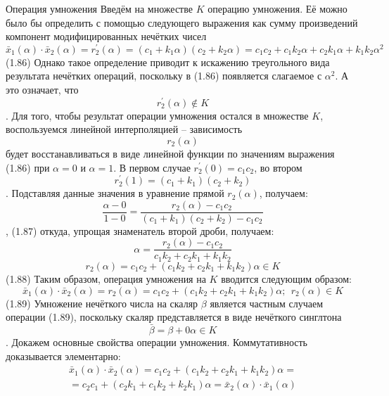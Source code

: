 Операция умножения
Введём на множестве $K$ операцию умножения. Её можно было бы определить с помощью следующего выражения как сумму произведений компонент модифицированных нечётких чисел
	\[{{\bar{x}}_{1}}(\alpha )\cdot {{\bar{x}}_{2}}(\alpha )=r_{2}^{'}\left( \alpha  \right)=\left( {{c}_{1}}+{{k}_{1}}\alpha  \right)\left( {{c}_{2}}+{{k}_{2}}\alpha  \right)={{c}_{1}}{{c}_{2}}+{{c}_{1}}{{k}_{2}}\alpha +{{c}_{2}}{{k}_{1}}\alpha +{{k}_{1}}{{k}_{2}}{{\alpha }^{2}}\] 	(1.86)
Однако такое определение приводит к искажению треугольного вида результата нечётких операций, поскольку в (1.86) появляется слагаемое с ${{\alpha }^{2}}$. А это означает, что \[r_{2}^{'}\left( \alpha  \right)\notin K\].
Для того, чтобы результат операции умножения остался в множестве $K$, воспользуемся линейной интерполяцией – зависимость \[{{r}_{2}}(\alpha )\] будет восстанавливаться в виде линейной функции по значениям выражения (1.86) при $\alpha =0$ и $\alpha =1$. В первом случае $r_{2}^{'}\left( 0 \right)={{c}_{1}}{{c}_{2}}$, во втором \[r_{2}^{'}\left( 1 \right)=\left( {{c}_{1}}+{{k}_{1}} \right)\left( {{c}_{2}}+{{k}_{2}} \right)\]. Подставляя данные значения в уравнение прямой ${{r}_{2}}\left( \alpha  \right)$, получаем:
	\[\frac{\alpha -0}{1-0}=\frac{{{r}_{2}}\left( \alpha  \right)-{{c}_{1}}{{c}_{2}}}{\left( {{c}_{1}}+{{k}_{1}} \right)\left( {{c}_{2}}+{{k}_{2}} \right)-{{c}_{1}}{{c}_{2}}}\],	(1.87)
откуда, упрощая знаменатель второй дроби, получаем:
	\[\alpha =\frac{{{r}_{2}}\left( \alpha  \right)-{{c}_{1}}{{c}_{2}}}{{{c}_{1}}{{k}_{2}}+{{c}_{2}}{{k}_{1}}+{{k}_{1}}{{k}_{2}}}\] 	\[{{r}_{2}}\left( \alpha  \right)={{c}_{1}}{{c}_{2}}+\left( {{c}_{1}}{{k}_{2}}+{{c}_{2}}{{k}_{1}}+{{k}_{1}}{{k}_{2}} \right)\alpha \in K\] 	(1.88)
Таким образом, операция умножения на $K$ вводится следующим образом:
	\[{{\bar{x}}_{1}}(\alpha )\cdot {{\bar{x}}_{2}}(\alpha )={{r}_{2}}\left( \alpha  \right)={{c}_{1}}{{c}_{2}}+({{c}_{1}}{{k}_{2}}+{{c}_{2}}{{k}_{1}}+{{k}_{1}}{{k}_{2}})\alpha ;\ \ {{r}_{2}}\left( \alpha  \right)\in K\] 	(1.89)
Умножение нечёткого числа на скаляр $\beta $ является частным случаем операции (1.89), поскольку скаляр представляется в виде нечёткого синглтона
	\[\bar{\beta }=\beta +0\alpha \in K\].
Докажем основные свойства операции умножения.
Коммутативность доказывается элементарно:
	\[\begin{matrix}
  {{{\bar{x}}}_{1}}(\alpha )\cdot {{{\bar{x}}}_{2}}(\alpha )={{c}_{1}}{{c}_{2}}+({{c}_{1}}{{k}_{2}}+{{c}_{2}}{{k}_{1}}+{{k}_{1}}{{k}_{2}})\alpha = \\ 
  ={{c}_{2}}{{c}_{1}}+\left( {{c}_{2}}{{k}_{1}}+{{c}_{1}}{{k}_{2}}+{{k}_{2}}{{k}_{1}} \right)\alpha ={{{\bar{x}}}_{2}}(\alpha )\cdot {{{\bar{x}}}_{1}}(\alpha ) \\ 
\end{matrix}\] 
